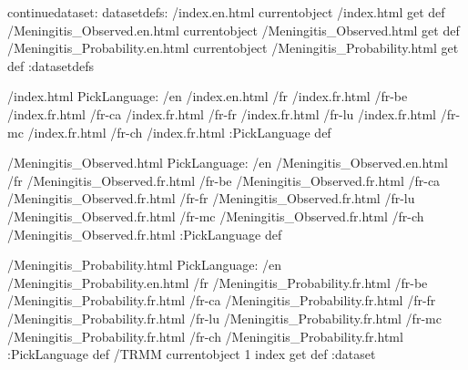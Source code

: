 \begin{ingrid}
continuedataset:
datasetdefs:
/index.en.html currentobject /index.html get def
/Meningitis_Observed.en.html currentobject /Meningitis_Observed.html get def
/Meningitis_Probability.en.html currentobject /Meningitis_Probability.html get def
:datasetdefs

/index.html {
PickLanguage:
/en /index.en.html
/fr /index.fr.html
/fr-be /index.fr.html
/fr-ca /index.fr.html
/fr-fr /index.fr.html
/fr-lu /index.fr.html
/fr-mc /index.fr.html
/fr-ch /index.fr.html
:PickLanguage
} def

/Meningitis_Observed.html {
PickLanguage:
/en /Meningitis_Observed.en.html
/fr /Meningitis_Observed.fr.html
/fr-be /Meningitis_Observed.fr.html
/fr-ca /Meningitis_Observed.fr.html
/fr-fr /Meningitis_Observed.fr.html
/fr-lu /Meningitis_Observed.fr.html
/fr-mc /Meningitis_Observed.fr.html
/fr-ch /Meningitis_Observed.fr.html
:PickLanguage
} def

/Meningitis_Probability.html {
PickLanguage:
/en /Meningitis_Probability.en.html
/fr /Meningitis_Probability.fr.html
/fr-be /Meningitis_Probability.fr.html
/fr-ca /Meningitis_Probability.fr.html
/fr-fr /Meningitis_Probability.fr.html
/fr-lu /Meningitis_Probability.fr.html
/fr-mc /Meningitis_Probability.fr.html
/fr-ch /Meningitis_Probability.fr.html
:PickLanguage
} def
/TRMM currentobject 1 index get def
:dataset
\end{ingrid}
